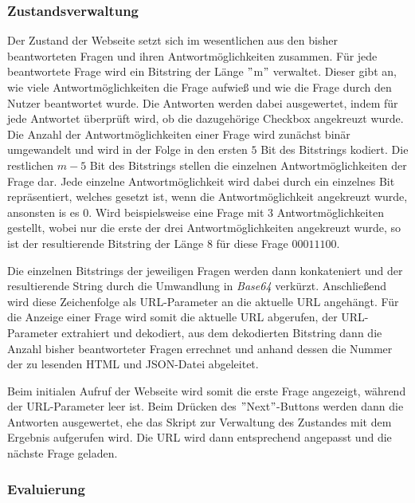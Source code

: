 \subsubsection{Zustandsverwaltung}

Der Zustand der Webseite setzt sich im wesentlichen aus den bisher beantworteten Fragen und ihren Antwortmöglichkeiten zusammen. Für jede beantwortete Frage wird ein Bitstring der Länge $"$m$"$ verwaltet. Dieser gibt an, wie viele Antwortmöglichkeiten die Frage aufwieß und wie die Frage durch den Nutzer beantwortet wurde. Die Antworten werden dabei ausgewertet, indem für jede Antwortet überprüft wird, ob die dazugehörige Checkbox angekreuzt wurde. Die Anzahl der Antwortmöglichkeiten einer Frage wird zunächst binär umgewandelt und wird in der Folge in den ersten $5$ Bit des Bitstrings kodiert. Die restlichen $m - 5$ Bit des Bitstrings stellen die einzelnen Antwortmöglichkeiten der Frage dar. Jede einzelne Antwortmöglichkeit wird dabei durch ein einzelnes Bit repräsentiert, welches gesetzt ist, wenn die Antwortmöglichkeit angekreuzt wurde, ansonsten is es $0$. Wird beispielsweise eine Frage mit $3$ Antwortmöglichkeiten gestellt, wobei nur die erste der drei Antwortmöglichkeiten angekreuzt wurde, so ist der resultierende Bitstring der Länge $8$ für diese Frage $00011100$.


Die einzelnen Bitstrings der jeweiligen Fragen werden dann konkateniert und der resultierende String durch die Umwandlung in \textit{Base64} verkürzt. Anschließend wird diese Zeichenfolge als URL-Parameter an die aktuelle URL angehängt. Für die Anzeige einer Frage wird somit die aktuelle URL abgerufen, der URL-Parameter extrahiert und dekodiert, aus dem dekodierten Bitstring dann die Anzahl bisher beantworteter Fragen errechnet und anhand dessen die Nummer der zu lesenden HTML und JSON-Datei abgeleitet.

Beim initialen Aufruf der Webseite wird somit die erste Frage angezeigt, während der URL-Parameter leer ist. Beim Drücken des $"$Next$"$-Buttons werden dann die Antworten ausgewertet, ehe das Skript zur Verwaltung des Zustandes mit dem Ergebnis aufgerufen wird. Die URL wird dann entsprechend angepasst und die nächste Frage geladen.

\subsubsection{Evaluierung}

